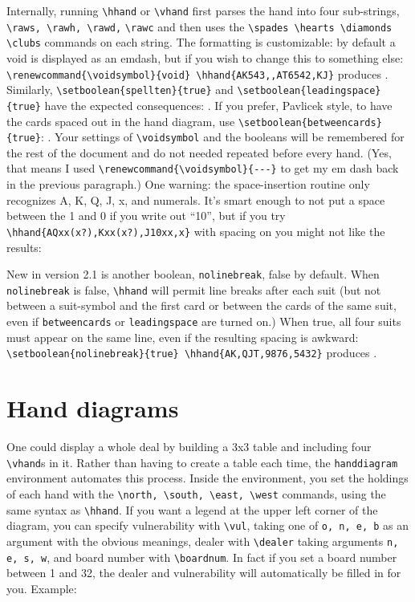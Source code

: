 \documentclass[10pt]{article}%
\begin{document}
Internally, running \verb+\hhand+ or \verb+\vhand+ first parses the hand into four sub-strings, \verb+\raws, \rawh, \rawd,+ \verb+\rawc+ and then uses the \verb+\spades \hearts \diamonds \clubs+ commands on each string. The formatting is customizable: by default a void is displayed as an emdash, but if you wish to change this to something else:  \verb+\renewcommand{\voidsymbol}{void} \hhand{AK543,,AT6542,KJ}+ produces \renewcommand{\voidsymbol}{void} . \renewcommand{\voidsymbol}{---} Similarly,  \verb+\setboolean{spellten}{true}+ and \verb+\setboolean{leadingspace}{true}+ have the expected consequences: .
If you prefer, Pavlicek style, to have the cards spaced out in the hand diagram, use \verb+\setboolean{betweencards}{true}+: . Your settings of \verb+\voidsymbol+ and the booleans will be remembered for the rest of the document and do not needed repeated before every hand. (Yes, that means I used \verb+\renewcommand{\voidsymbol}{---}+ to get my em dash back in the previous paragraph.) One warning: the space-insertion routine only recognizes A, K, Q, J, x, and numerals. It's smart enough to not put a space between the 1 and 0 if you write out ``10'', but if you try \verb+\hhand{AQxx(x?),Kxx(x?),J10xx,x}+ with spacing on you might not like the results: 

New in version 2.1 is another boolean, \verb+nolinebreak+, false by default. When \verb+nolinebreak+ is false, \verb+\hhand+ will permit line breaks after each suit (but not between a suit-symbol and the first card or between the cards of the same suit, even if \verb+betweencards+ or \verb+leadingspace+ are turned on.)  When true, all four suits must appear on the same line, even if the resulting spacing is awkward:\\
\noindent \verb+\setboolean{nolinebreak}{true} \hhand{AK,QJT,9876,5432}+ produces .

\section{Hand diagrams}

One could display a whole deal by building a 3x3 table and including four \verb+\vhand+s in it. Rather than having to create a table each time, the \verb+handdiagram+ environment automates this process. Inside the environment, you set the holdings of each hand with the \verb+\north, \south, \east, \west+ commands, using the same syntax as \verb+\hhand+. If you want a legend at the upper left corner of the diagram, you can specify vulnerability with \verb+\vul+, taking one of \verb+o, n, e, b+  as an argument with the obvious meanings, dealer with \verb+\dealer+ taking arguments \verb+n, e, s, w+, and board number with \verb+\boardnum+. In fact if you set a board number between 1 and 32, the dealer and vulnerability will automatically be filled in for you. Example:
\end{document}
